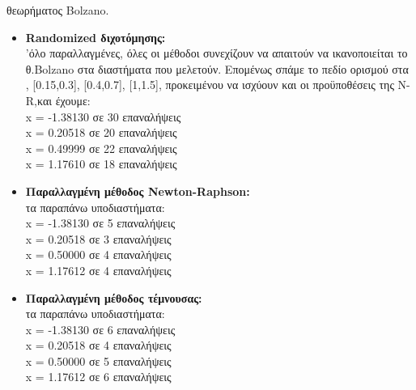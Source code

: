 \documentclass{article}
\newcommand{\lt}{\latintext}
\newcommand{\gt}{\greektext}
\begin{document}
 θεωρήματος \lt Bolzano.
\begin{itemize}
    \item \textbf{\lt Randomized  διχοτόμησης:}\\
            'όλο παραλλαγμένες, όλες οι μέθοδοι συνεχίζουν να απαιτούν να ικανοποιείται το
            \gt θ.\lt Bolzano \gt στα διαστήματα που μελετούν. Επομένως σπάμε το πεδίο ορισμού στα
            \gt[-2,-1.3], [0.15,0.3], [0.4,0.7], [1,1.5], προκειμένου να ισχύουν και οι προϋποθέσεις
             της \lt N-R,\gt και έχουμε:\\
            \lt x = -1.38130 \gt σε 30 επαναλήψεις\\
            \lt x = 0.20518 \gt σε 20 επαναλήψεις\\
            \lt x = 0.49999 \gt σε 22 επαναλήψεις\\
            \lt x = 1.17610 \gt σε 18 επαναλήψεις\\
    \item \textbf{\gt Παραλλαγμένη μέθοδος \lt Newton-Raphson:}\\
             τα παραπάνω υποδιαστήματα:\\
            \lt x = -1.38130 \gt σε 5 επαναλήψεις\\
            \lt x = 0.20518 \gt σε 3 επαναλήψεις\\
            \lt x = 0.50000 \gt σε 4 επαναλήψεις\\
            \lt x = 1.17612 \gt σε 4 επαναλήψεις\\
    \item \textbf{\gt Παραλλαγμένη μέθοδος τέμνουσας:}\\
             τα παραπάνω υποδιαστήματα:\\
            \lt x = -1.38130 \gt σε 6 επαναλήψεις\\
            \lt x = 0.20518 \gt σε 4 επαναλήψεις\\
            \lt x = 0.50000 \gt σε 5 επαναλήψεις\\
            \lt x = 1.17612 \gt σε 6 επαναλήψεις\\
\end{itemize}
\end{document}
